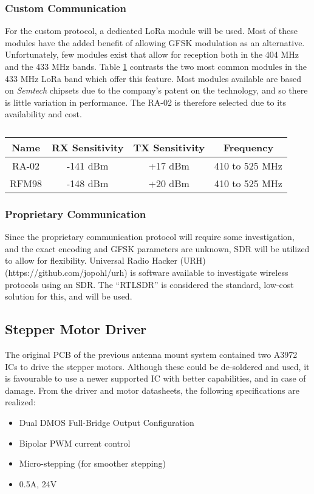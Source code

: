 \subsubsection{Custom Communication}
For the custom protocol, a dedicated LoRa module will be used. Most of these modules have the added benefit of allowing GFSK modulation as an alternative. Unfortunately, few modules exist that allow for reception both in the 404 MHz and the 433 MHz bands. Table \ref{tab:rfTransceivers} contrasts the two most common modules in the 433 MHz LoRa band which offer this feature. Most modules available are based on \textit{Semtech} chipsets due to the company's patent on the technology, and so there is little variation in performance. The RA-02 is therefore selected due to its availability and cost.

\begin{table}[!htb]
  \centering
  \renewcommand{\arraystretch}{1.2}
  \begin{tabular}{ |c|c|c|c| }
  \hline
  \textbf{Name}   & \textbf{RX Sensitivity} & \textbf{TX Sensitivity}& \textbf{Frequency} \\
  \hline
  RA-02           & -141 dBm             & +17 dBm              & 410 to 525 MHz     \\
  RFM98           & -148 dBm             & +20 dBm              & 410 to 525 MHz     \\
  \hline
  \end{tabular}
  \caption{}
  \label{tab:rfTransceivers}
\end{table}

\subsubsection{Proprietary Communication}
Since the proprietary communication protocol will require some investigation, and the exact encoding and GFSK parameters are unknown, SDR will be utilized to allow for flexibility. Universal Radio Hacker (URH) (https://github.com/jopohl/urh) is software available to investigate wireless protocols using an SDR. The “RTLSDR” is considered the standard, low-cost solution for this, and will be used.

\subsection{Stepper Motor Driver}
The original PCB of the previous antenna mount system contained two A3972 ICs to drive the stepper motors. Although these could be de-soldered and used, it is favourable to use a newer supported IC with better capabilities, and in case of damage. From the driver and motor datasheets, the following specifications are realized:
\begin{itemize}
    \item Dual DMOS Full-Bridge Output Configuration
    \item Bipolar PWM current control
    \item Micro-stepping (for smoother stepping)
    \item 0.5A, 24V
\end{itemize}

